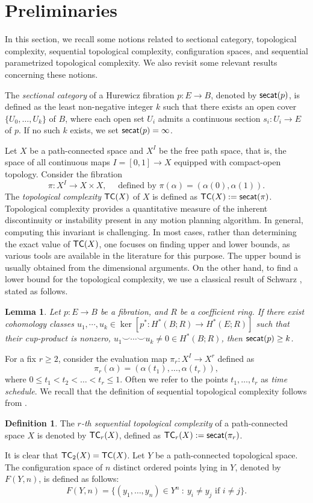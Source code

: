 \documentclass[12pt,oneside,reqno]{amsart}
\theoremstyle{plain}
\newtheorem{lemma}[theorem]{Lemma}
\theoremstyle{definition}
\newtheorem{definition}[theorem]{Definition}
\theoremstyle{remark}
\newcommand{\sect}{\setcounter{figure}{0}\section}
\newcommand{\secat}{{\sf {secat}}}
\newcommand{\TC}{{\sf {TC}}}
\begin{document}
\sect{Preliminaries}\label{sec:preliminaries}

In this section, we recall some notions related to sectional category, topological complexity, sequential topological complexity, configuration spaces, and sequential parametrized topological complexity. We also revisit some relevant results concerning these notions.

The \emph{sectional category} of a Hurewicz fibration $p: E\to B$, denoted by $\secat(p)$, is defined as the least non-negative integer $k$ such that there exists an open cover $\{U_0, \dots, U_k\}$ of $B$, where each open set $U_i$ admits a continuous section $s_i \colon U_i \to E$ of $p$. If no such $k$ exists, we set $\secat(p)=\infty$.

Let $X$ be a path-connected space and $X^I$ be the free path space, that is, the space of all continuous maps $I=[0,1] \to X$ equipped with compact-open topology. 
Consider the fibration $$\pi \colon X^I \to X \times X, \quad \text{ defined by } \pi(\alpha)=(\alpha(0), \alpha(1)).$$ 
The \emph{topological complexity} $\TC(X)$ of $X$ is defined as $\TC(X) := \secat(\pi)$. Topological complexity provides a quantitative measure of the inherent discontinuity or instability present in any motion planning algorithm. In general, computing this invariant is challenging. In most cases, rather than determining the exact value of $\TC(X)$, one focuses on finding upper and lower bounds, as various tools are available in the literature for this purpose. The upper bound is usually obtained from the dimensional arguments. On the other hand, to find a lower bound for the topological complexity, we use a classical result of Schwarz \cite{Sva66}, stated as follows.

\begin{lemma}\label{Lem_lower bound of secat}	
Let $p: E \to B$ be a fibration, and $R$ be a coefficient ring. If there exist cohomology classes $u_1, \cdots, u_k\in \ker[p^*: H^*(B; R)\to H^*(E; R)]$ such that their cup-product is nonzero, $u_1 \smile \cdots \smile u_k \neq 0 \in H^*(B; R)$, then $\secat(p) \geq k$.
\end{lemma}

For a fix $r \geq 2$, consider the evaluation map $\pi_r \colon X^I \to X^r$ defined as $$\pi_r(\alpha)=(\alpha(t_1), \dots, \alpha(t_r)),$$ where $0 \leq t_1 <t_2 < \dots < t_r \leq 1$. Often we refer to the points $t_1, \dots, t_r$ as \emph{time schedule}.
We recall that the definition of sequential topological complexity follows from \cite{Rud10}.
\begin{definition}
The \emph{$r$-th sequential topological complexity} of a path-connected space $X$ is denoted by $\TC_r(X)$, defined as $\TC_r(X):=\secat (\pi_r)$. 
\end{definition}
It is clear that $\TC_2(X)=\TC(X)$.
Let $Y$ be a path-connected topological space. The configuration space of $n$ distinct ordered points lying in $Y$, denoted by $F(Y, n)$, is defined as follows:
\begin{equation*}
F(Y, n)= \{(y_1, \dots, y_n)\in Y^n~ \colon ~ y_i\neq y_j \text{ if } i\neq j\}.
\end{equation*} 
\end{document}
